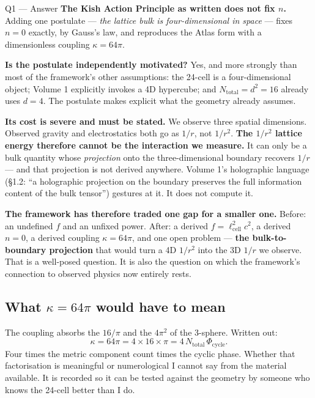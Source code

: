 \documentclass[11pt,letterpaper]{article}
\newcommand{\lcell}{\ell_{\mathrm{cell}}}
\begin{document}
\begin{answerbox}{Q1 --- Answer}
\textbf{The Kish Action Principle as written does not fix $n$.} Adding one postulate ---
\emph{the lattice bulk is four-dimensional in space} --- fixes $n = 0$ exactly, by Gauss's
law, and reproduces the Atlas form with a dimensionless coupling $\kappa = 64\pi$.

\medskip
\textbf{Is the postulate independently motivated?} Yes, and more strongly than most of the
framework's other assumptions: the 24-cell is a four-dimensional object; Volume 1 explicitly
invokes a 4D hypercube; and $N_{\mathrm{total}} = d^2 = 16$ already uses $d=4$. The
postulate makes explicit what the geometry already assumes.

\medskip
\textbf{Its cost is severe and must be stated.} We observe three spatial dimensions.
Observed gravity and electrostatics both go as $1/r$, not $1/r^2$. \textbf{The $1/r^2$
lattice energy therefore cannot be the interaction we measure.} It can only be a bulk
quantity whose \emph{projection} onto the three-dimensional boundary recovers $1/r$ --- and
that projection is not derived anywhere. Volume 1's holographic language (\S1.2: ``a
holographic projection on the boundary preserves the full information content of the bulk
tensor'') gestures at it. It does not compute it.

\medskip
\textbf{The framework has therefore traded one gap for a smaller one.} Before: an undefined
$f$ and an unfixed power. After: a derived $f = \lcell^2 c^2$, a derived $n = 0$, a derived
coupling $\kappa = 64\pi$, and one open problem --- \textbf{the bulk-to-boundary projection}
that would turn a 4D $1/r^2$ into the 3D $1/r$ we observe. That is a well-posed question.
It is also the question on which the framework's connection to observed physics now entirely
rests.
\end{answerbox}

\subsection{What $\kappa = 64\pi$ would have to mean}

The coupling absorbs the $16/\pi$ and the $4\pi^2$ of the 3-sphere. Written out:
\[
\kappa = 64\pi = 4 \times 16 \times \pi = 4\, N_{\mathrm{total}}\, \Phi_{\mathrm{cycle}} .
\]
Four times the metric component count times the cyclic phase. Whether that factorisation is
meaningful or numerological I cannot say from the material available. It is recorded so it
can be tested against the geometry by someone who knows the 24-cell better than I do.
\end{document}
